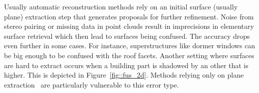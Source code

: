                 \begin{figure}[htb]
                    \centering
                \end{figure}

                Usually automatic reconstruction methods rely on an initial surface (usually plane) extraction step that generates proposals for further refinement.
                Noise from stereo pairing or missing data in point clouds result in imprecisions in elementary surface retrieval which then lead to surfaces being confused.
                The accuracy drops even further in some cases.
                For instance, superstructures like dormer windows can be big enough to be confused with the roof facets.
                Another setting where surfaces are hard to extract occurs when a building part is shadowed by an other that is higher.
                This is depicted in Figure~\ref{fig::fus_2d}.
                Methods relying only on plane extraction~\parencite{taillandier2004automatic,durupt2006automatic,nan2017polyfit} are particularly vulnerable to this error type.\\

